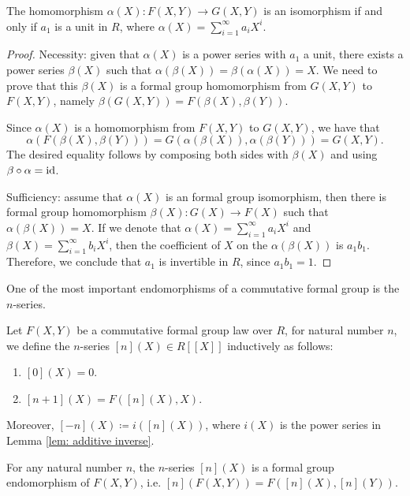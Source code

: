 \begin{lemma}
    The homomorphism $\alpha(X) : F(X,Y) \to G(X,Y) $ is an isomorphism if and only
    if $a_1$ is a unit in $R$, where $\alpha (X) = \sum_{i=1}^{\infty} a_i X ^ i $.
    \label{lem: hom_iff_coeff_unit}
\end{lemma}

\begin{proof}
    Necessity: given that $\alpha (X)$ is a power series with $a_1$ a unit, there exists a power series
    $\beta (X)$ such that $\alpha (\beta (X)) =\beta (\alpha (X)) = X$. We need to prove that
    this $\beta (X)$ is a formal group homomorphism from $G(X,Y)$ to $F(X,Y)$, namely
    $\beta (G(X,Y)) = F (\beta (X), \beta (Y))$. \par
    Since $\alpha (X)$ is a homomorphism from $F(X,Y)$ to $G(X,Y)$, we have that
    \[ \alpha (F(\beta(X), \beta (Y))) = G(\alpha (\beta (X)), \alpha (\beta (Y))) = G(X,Y).\]
    The desired equality follows by composing both sides with $\beta (X)$ and using $\beta \circ \alpha = \mathrm{id}$.

    Sufficiency: assume that $\alpha(X)$ is an formal group isomorphism, then there
    is formal group homomorphism $\beta(X) : G(X) \to F(X)$ such that $\alpha(\beta(X)) = X$.
    If we denote that $\alpha(X) = \sum_{i=1}^{\infty} a_i X ^ i$ and
    $\beta(X) = \sum_{i=1}^{\infty}b_i X ^ i$, then the coefficient of $X$ on the
    $\alpha(\beta(X))$ is $a_1 b _1$. Therefore, we conclude that $a_1$ is invertible
    in $R$, since $a_1 b_1 = 1$.
\end{proof}

One of the most important endomorphisms of a commutative formal group is the $n$-series.

\begin{definition}
    Let $F(X,Y)$ be a commutative formal group law over $R$,
    for natural number $n$, we define the $n$-series $[n](X)\in R[\![X]\!]$ inductively
    as follows:
    \begin{enumerate}
        \item $[0](X) = 0$.
        \item $[n+ 1](X) = F([n](X), X)$.
    \end{enumerate}
    Moreover, $[-n](X) \coloneqq i ([n](X))$, where $i(X)$ is the power series in Lemma
    \ref{lem: additive inverse}.
\end{definition}


\begin{proposition}
    For any natural number $n$, the $n$-series $[n](X)$ is a formal group endomorphism of $F(X,Y)$,
    i.e. $[n](F(X,Y)) = F ([n](X), [n](Y))$.
    \label{prop: nseries_end}
\end{proposition}

